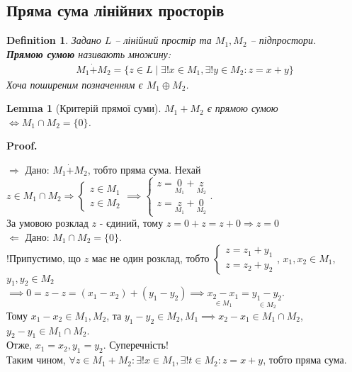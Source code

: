 \documentclass[a4paper, 10pt]{article}
\makeatletter
\def\rightproof{$\boxed{\Rightarrow}$ }
\def\leftproof{$\boxed{\Leftarrow}$ }
\theoremstyle{theoremdd}
\newtheorem{definition}[theorem]{Definition}
\newtheorem{lemma}[theorem]{Lemma}
\renewenvironment{proof}[1][Proof.\\]{\par
\pushQED{\hfill \qed}%
\normalfont \topsep6\p@\@plus6\p@\relax
\trivlist
\item\relax
{\bfseries
#1\@addpunct{.}}\hspace\labelsep\ignorespaces
}{%
\popQED\endtrivlist\@endpefalse
}
\makeatother
\begin{document}
	\subsection{Пряма сума лінійних просторів}
	\begin{definition}
	Задано $L$ -- лінійний простір та $M_1, M_2$ -- підпростори.\\
	\textbf{Прямою сумою} називають множину:
	\begin{align*}
	M_1 \dot{+} M_2 = \{z \in L \mid \exists! x \in M_1, \exists! y \in M_2: z = x+y\}
	\end{align*}
	Хоча поширеним позначенням є $M_1 \oplus M_2$.
	\end{definition}
	
	\begin{lemma}[Критерій прямої суми]
	$M_1 + M_2$ є прямою сумою $\iff M_1 \cap M_2 = \{0\}$.
	\end{lemma}
	
	\begin{proof}
	\rightproof Дано: $M_1 \dot{+} M_2$, тобто пряма сума. Нехай $z \in M_1 \cap M_2 \Rightarrow \begin{cases} z \in M_1 \\ z \in M_2 \end{cases} \implies \begin{cases} z = \underset{M_1}{0} + \underset{M_2}{z} \\ z = \underset{M_1}{z} + \underset{M_2}{0} \end{cases}$.\\
	За умовою розклад $z$ - єдиний, тому $z=0+z=z+0 \Rightarrow z = 0$
	\bigskip \\
	\leftproof Дано: $M_1 \cap M_2 = \{0\}$.\\
	!Припустимо, що $z$ має не один розклад, тобто $\begin{cases} z = z_1 + y_1 \\ z = z_2 + y_2 \end{cases}$, $x_1,x_2 \in M_1$, $y_1,y_2 \in M_2$\\
	$\implies 0 = z-z=(x_1-x_2)+(y_1-y_2) \implies \underset{\in M_1}{x_2-x_1}=\underset{\in M_2}{y_1-y_2}$.\\
	Тому $x_1-x_2 \in M_1, M_2$, та $y_1-y_2 \in M_2, M_1 \implies x_2-x_1 \in M_1 \cap M_2$, $y_2 - y_1 \in M_1 \cap M_2$.\\
	Отже, $x_1 = x_2, y_1 = y_2$. Суперечність! \\
	Таким чином, $\forall z \in M_1 + M_2: \exists! x \in M_1, \exists! t \in M_2: z = x+y$, тобто пряма сума.
	\end{proof}
	
\end{document}
